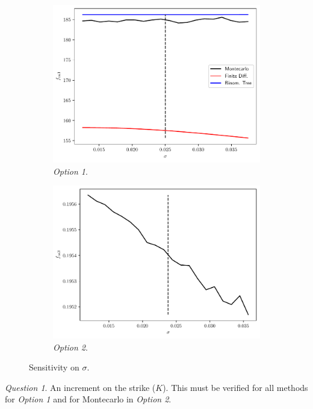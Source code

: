 \documentclass[11pt]{article}
\theoremstyle{definition}
\theoremstyle{remark}
\theoremstyle{remark}
\newtheorem{question}{Question}
\begin{document}
\begin{figure}[H]
  \centering
  \begin{subfigure}[b]{0.45\textwidth}
      \centering
      \includegraphics[scale=0.52]{../plts/third_sens_opt1.pdf}
      \caption{\textit{Option 1}.}
  \end{subfigure}
  \begin{subfigure}[b]{0.45\textwidth}
      \centering
      \includegraphics[scale=0.52]{../plts/third_sens_opt2.pdf}
      \caption{\textit{Option 2}.}
  \end{subfigure}
  \caption{Sensitivity on $\sigma$.}
  \label{fig:third_sens}
\end{figure}

\begin{question}
  An increment on the strike ($K$). This must be verified for all methods for
  \textit{Option 1} and for Montecarlo in \textit{Option 2}.
\end{question}
\end{document}
